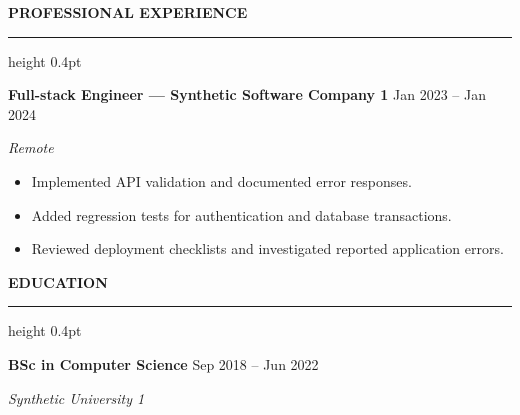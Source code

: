 \documentclass[10pt,letterpaper]{article}
\newcommand{\atsSectionToSection}{9pt}
\newcommand{\atsHeadingToContent}{3pt}
\newcommand{\atsRoleToMetadata}{1.5pt}
\newcommand{\atsMetadataToBullets}{2.5pt}
\newcommand{\atsBulletToBullet}{1.2pt}
\newcommand{\atssection}[1]{%
  \vspace{\atsSectionToSection}%
  {\noindent\large\bfseries\uppercase{#1}}\par
  \vspace{1.5pt}\hrule height 0.4pt\vspace{\atsHeadingToContent}%
}
\begin{document}
\atssection{Professional Experience}
\textbf{Full-stack Engineer — Synthetic Software Company 1} \hfill Jan 2023 -- Jan 2024\par
\vspace{\atsRoleToMetadata}
{\small\textit{Remote}}\par
\vspace{\atsMetadataToBullets}
\begin{itemize}
\setlength{\itemsep}{\atsBulletToBullet}\setlength{\parskip}{0pt}\setlength{\parsep}{0pt}\setlength{\topsep}{0pt}\setlength{\partopsep}{0pt}
  \item Implemented API validation and documented error responses.
  \item Added regression tests for authentication and database transactions.
  \item Reviewed deployment checklists and investigated reported application errors.
\end{itemize}

\atssection{Education}
\textbf{BSc in Computer Science} \hfill Sep 2018 -- Jun 2022\par
\vspace{\atsRoleToMetadata}
{\small\textit{Synthetic University 1}}\par
\end{document}

